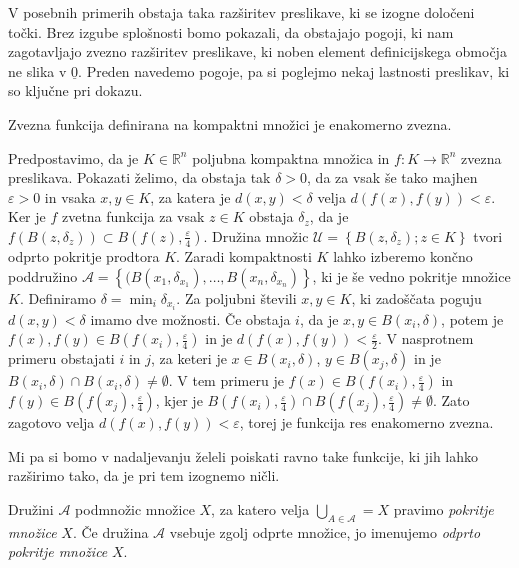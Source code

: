 \documentclass[mat1]{fmfdelo}
\newcommand{\R}{\mathbb R}
\newcommand{\0}{\underline{0}}
\newcommand{\pA}{\mathcal A}
\newcommand{\pU}{\mathcal U}
\begin{document}
V posebnih primerih obstaja taka razširitev preslikave, ki se izogne določeni točki. Brez izgube splošnosti bomo pokazali, da obstajajo pogoji, ki nam zagotavljajo zvezno razširitev preslikave, ki noben element definicijskega območja ne slika v $\0$. Preden navedemo pogoje, pa si poglejmo nekaj lastnosti preslikav, ki so ključne pri dokazu.

\begin{trditev}
Zvezna funkcija definirana na kompaktni množici je enakomerno zvezna.
\end{trditev}
\begin{dokaz}
Predpostavimo, da je $K \in \R^n$ poljubna kompaktna množica in $f : K \to \R^n$ zvezna preslikava. Pokazati želimo, da obstaja tak $\delta > 0$, da za vsak še tako majhen $\varepsilon > 0$ in vsaka $x, y \in K$, za katera je $d(x, y) < \delta$ velja $d(f(x), f(y)) < \varepsilon$. Ker je $f$ zvetna funkcija za vsak $z \in K$ obstaja $\delta_z$, da je $f(B(z, \delta_z)) \subset B(f(z), \frac{\varepsilon}{4})$. Družina množic $\pU = \left \{ B(z, \delta_z); z \in K \right \}$ tvori odprto pokritje prodtora $K$. Zaradi kompaktnosti $K$ lahko izberemo končno poddružino $\pA =  \left \{ (B(x_1, \delta_{x_1}), \dots, B(x_n, \delta_{x_n}) \right \}$, ki je še vedno pokritje množice $K$. Definiramo $\delta = \min_i \delta_{x_i}$. Za poljubni števili $x, y \in K$, ki zadoščata poguju $d(x, y) < \delta$ imamo dve možnosti. Če obstaja $i$, da je $x, y \in B(x_i, \delta)$, potem je $f(x), f(y) \in B(f(x_i), \frac{\varepsilon}{4})$ in je $d(f(x), f(y)) < \frac{\varepsilon}{2}$. V nasprotnem primeru obstajati $i$ in $j$, za keteri je $x \in B(x_i, \delta)$, $y \in B(x_j, \delta)$ in je $B(x_i, \delta) \cap B(x_i, \delta) \neq \emptyset$. V tem primeru je $f(x) \in B(f(x_i), \frac{\varepsilon}{4})$ in $f(y) \in B(f(x_j), \frac{\varepsilon}{4})$, kjer je $B(f(x_i), \frac{\varepsilon}{4}) \cap B(f(x_j), \frac{\varepsilon}{4}) \neq \emptyset$. Zato zagotovo velja $d(f(x), f(y)) < \varepsilon$, torej je funkcija res enakomerno zvezna.
\end{dokaz}

Mi pa si bomo v nadaljevanju želeli poiskati ravno take funkcije, ki jih lahko razširimo tako, da je pri tem izognemo ničli. 
\begin{definicija}
Družini $\mathcal{A}$ podmnožic množice $X$, za katero velja $\bigcup_{A \in \mathcal{A}} = X$ pravimo \emph{pokritje množice} $X$. Če družina $\mathcal{A}$ vsebuje zgolj odprte množice, jo imenujemo \emph{odprto pokritje množice} $X$.
\end{definicija}
\end{document}
